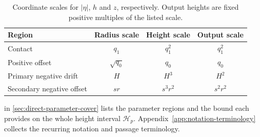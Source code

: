 \begin{table}[!htbp]
\centering
\small
\caption{Coordinate scales for \(|\eta|\), \(h\) and \(z\), respectively.
  Output heights are fixed positive multiples of the listed scale.}
\label{tab:direct-scale-guide}
\begin{tabular}{@{}lccc@{}}
\hline
Region & Radius scale & Height scale & Output scale\\
\hline
Contact & \(q_1\) & \(q_1^2\) & \(q_1^2\)\\
Positive offset & \(\sqrt{q_0}\) & \(q_0\) & \(q_0\)\\
Primary negative drift & \(H\) & \(H^3\) & \(H^2\)\\
Secondary negative offset & \(sr\) & \(s^3r^2\) & \(s^2r^2\)\\
\hline
\end{tabular}
\end{table}

 in \cref{sec:direct-parameter-cover}
lists the parameter regions and the bound each provides on the whole
height interval \(\mathcal H_p\). Appendix~\ref{app:notation-terminology} collects the recurring notation
and passage terminology.
